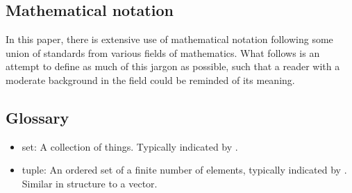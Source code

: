 \appendixpage
\begin{appendix}
\section{Mathematical notation}
\label{sec:notation}
In this paper, there is extensive use of mathematical notation following some union of standards from various fields of mathematics. What follows is an attempt to define as much of this jargon as possible, such that a reader with a moderate background in the field could be reminded of its meaning.


\subsection{Glossary}
\begin{itemize}
\item set: A collection of things. Typically indicated by \braces{\cdot}.
\item tuple: An ordered set of a finite number of elements, typically indicated by \parens{\cdot}. Similar in structure to a vector.
\end{itemize}


\end{appendix}
